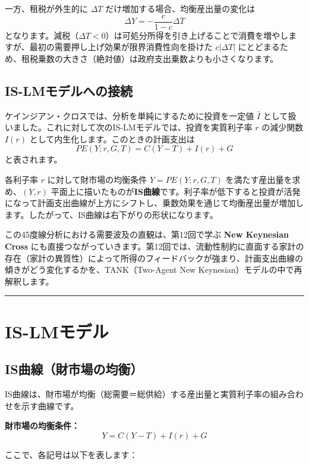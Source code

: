 \documentclass[
  japanese,
  lualatex,
  ja=standard,
  12pt,
  a4paper]{ltjsarticle}
\begin{document}
一方、租税が外生的に \(\Delta T\) だけ増加する場合、均衡産出量の変化は
\[
\Delta Y
=
-
\frac{c}{1-c}\Delta T
\]
となります。減税（\(\Delta T < 0\)）は可処分所得を引き上げることで消費を増やしますが、最初の需要押し上げ効果が限界消費性向を掛けた
\(c|\Delta T|\)
にとどまるため、租税乗数の大きさ（絶対値）は政府支出乗数よりも小さくなります。

\subsection{IS-LMモデルへの接続}\label{is-lmux30e2ux30c7ux30ebux3078ux306eux63a5ux7d9a}

ケインジアン・クロスでは、分析を単純にするために投資を一定値 \(\bar{I}\)
として扱いました。これに対して次のIS-LMモデルでは、投資を実質利子率
\(r\) の減少関数 \(I(r)\) として内生化します。このときの計画支出は \[
PE(Y;r,G,T)=C(Y-T)+I(r)+G
\] と表されます。

各利子率 \(r\) に対して財市場の均衡条件 \(Y=PE(Y;r,G,T)\)
を満たす産出量を求め、\((Y, r)\)
平面上に描いたものが\textbf{IS曲線}です。利子率が低下すると投資が活発になって計画支出曲線が上方にシフトし、乗数効果を通じて均衡産出量が増加します。したがって、IS曲線は右下がりの形状になります。

この45度線分析における需要波及の直観は、第12回で学ぶ \textbf{New
Keynesian Cross}
にも直接つながっていきます。第12回では、流動性制約に直面する家計の存在（家計の異質性）によって所得のフィードバックが強まり、計画支出曲線の傾きがどう変化するかを、TANK（Two-Agent
New Keynesian）モデルの中で再解釈します。

\begin{center}\rule{0.5\linewidth}{0.5pt}\end{center}

\section{IS-LMモデル}\label{is-lmux30e2ux30c7ux30eb}

\subsection{IS曲線（財市場の均衡）}\label{isux66f2ux7ddaux8ca1ux5e02ux5834ux306eux5747ux8861}

IS曲線は、財市場が均衡（総需要＝総供給）する産出量と実質利子率の組み合わせを示す曲線です。

\textbf{財市場の均衡条件：} \[
Y = C(Y - T) + I(r) + G
\]

ここで、各記号は以下を表します：
\end{document}

